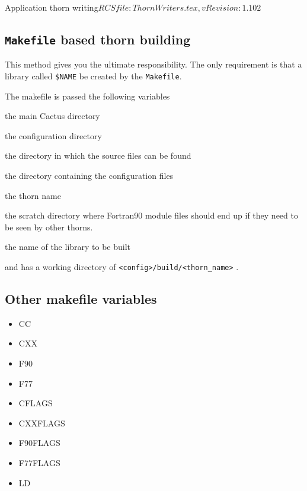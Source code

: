 \begin{cactuspart}{2}{Application thorn writing}{$RCSfile: ThornWriters.tex,v $}{$Revision: 1.102 $}
\subsection{{\tt Makefile} based thorn building}

This method gives you the ultimate responsibility.
The only requirement is that
a library called {\tt \$NAME} be created by the {\tt Makefile}.

The makefile is passed the following variables
\begin{Lentry}

\item [{\tt \$(CCTK\_HOME)}]  the main Cactus directory

\item [{\tt \$(TOP)}] the configuration directory

\item [{\tt \$(SRCDIR)}] the directory in which the source files can be found

\item [{\tt \$(CONFIG)}]  the directory containing the configuration files

\item [{\tt \$(THORN)}]   the thorn name

\item [{\tt \$(SCRATCH\_BUILD)}]  the scratch directory where Fortran90 module
files should end up if they need to be seen by other thorns.

\item [{\tt \$(NAME)}] the name of the library to be built

\end{Lentry}

and has a working directory of {\tt <config>/build/<thorn\_name>} .

\subsection{Other makefile variables}

\begin{itemize}
\item CC
\item CXX
\item F90
\item F77
\item CFLAGS
\item CXXFLAGS
\item F90FLAGS
\item F77FLAGS
\item LD
\end{itemize}


\end{cactuspart}
